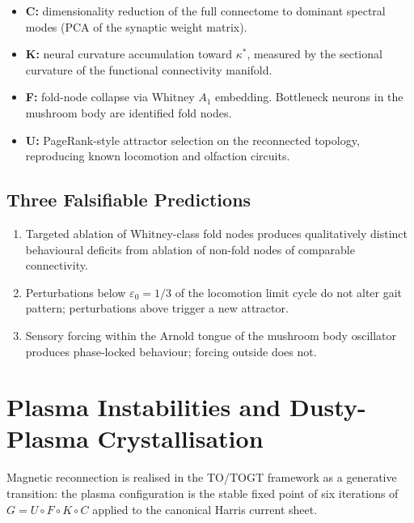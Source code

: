 \documentclass[11pt, twoside, openright]{book}
\theoremstyle{plain}
\theoremstyle{definition}
\newcommand{\eps}{\varepsilon_0}
\begin{document}
\begin{itemize}[leftmargin=*]
  \item \textbf{C:} dimensionality reduction of the full connectome to
    dominant spectral modes (PCA of the synaptic weight matrix).
  \item \textbf{K:} neural curvature accumulation toward $\kappa^*$,
    measured by the sectional curvature of the functional connectivity
    manifold.
  \item \textbf{F:} fold-node collapse via Whitney $A_1$ embedding.
    Bottleneck neurons in the mushroom body are identified fold nodes.
  \item \textbf{U:} PageRank-style attractor selection on the
    reconnected topology, reproducing known locomotion and olfaction
    circuits.
\end{itemize}

\section{Three Falsifiable Predictions}

\begin{enumerate}[label=\arabic*.]
  \item Targeted ablation of Whitney-class fold nodes produces
    qualitatively distinct behavioural deficits from ablation of
    non-fold nodes of comparable connectivity.
  \item Perturbations below $\eps = 1/3$ of the locomotion limit cycle
    do not alter gait pattern; perturbations above trigger a new
    attractor.
  \item Sensory forcing within the Arnold tongue of the mushroom body
    oscillator produces phase-locked behaviour; forcing outside does not.
\end{enumerate}

\chapter{Plasma Instabilities and Dusty-Plasma Crystallisation}

Magnetic reconnection is realised in the TO/TOGT framework as a
generative transition: the plasma configuration is the stable fixed
point of six iterations of $G = U \circ F \circ K \circ C$ applied
to the canonical Harris current sheet.
\end{document}
